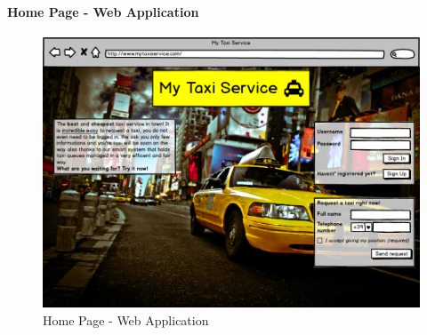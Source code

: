 		\paragraph{Home Page - Web Application}
		\begin{figure}[!h]
			\begin{center}					
				\includegraphics[scale=0.45]{../SE2_MOCKUPS/WebAppHomePage.png}
				\caption{Home Page - Web Application}
			\end{center}	
		\end{figure}
		\newpage
